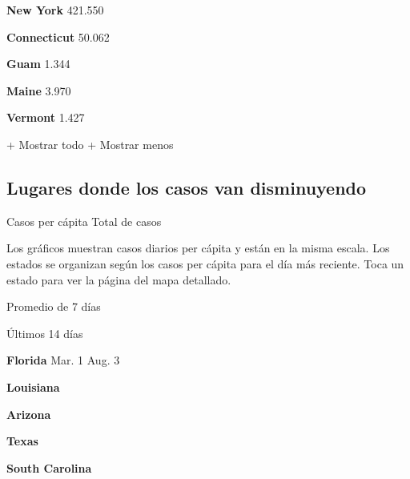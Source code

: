 \textbf{New York} 421.550

\href{https://www.nytimes.com/interactive/2020/us/connecticut-coronavirus-cases.html}{}

\textbf{Connecticut} 50.062

\textbf{Guam} 1.344

\href{https://www.nytimes.com/interactive/2020/us/maine-coronavirus-cases.html}{}

\textbf{Maine} 3.970

\href{https://www.nytimes.com/interactive/2020/us/vermont-coronavirus-cases.html}{}

\textbf{Vermont} 1.427

+ Mostrar todo + Mostrar menos

\hypertarget{lugares-donde-los-casos-van-disminuyendo}{%
\subsection{Lugares donde los casos van
disminuyendo}\label{lugares-donde-los-casos-van-disminuyendo}}

Casos per cápita Total de casos

Los gráficos muestran casos diarios per cápita y están en la misma
escala. Los estados se organizan según los casos per cápita para el día
más reciente. Toca un estado para ver la página del mapa detallado.

\href{https://www.nytimes.com/interactive/2020/us/florida-coronavirus-cases.html}{}

Promedio de 7 días

Últimos 14 días

\textbf{Florida} Mar. 1 Aug. 3

\href{https://www.nytimes.com/interactive/2020/us/louisiana-coronavirus-cases.html}{}

\textbf{Louisiana}

\href{https://www.nytimes.com/interactive/2020/us/arizona-coronavirus-cases.html}{}

\textbf{Arizona}

\href{https://www.nytimes.com/interactive/2020/us/texas-coronavirus-cases.html}{}

\textbf{Texas}

\href{https://www.nytimes.com/interactive/2020/us/south-carolina-coronavirus-cases.html}{}

\textbf{South Carolina}

\href{https://www.nytimes.com/interactive/2020/us/idaho-coronavirus-cases.html}{}

